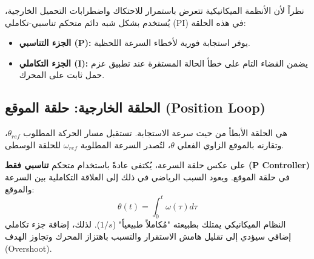 نظراً لأن الأنظمة الميكانيكية تتعرض باستمرار للاحتكاك واضطرابات التحميل الخارجية، يُستخدم بشكل شبه دائم متحكم تناسبي-تكاملي (\textenglish{PI}) في هذه الحلقة:
\begin{itemize}
    \item \textbf{الجزء التناسبي (\textenglish{P}):} يوفر استجابة فورية لأخطاء السرعة اللحظية.
    \item \textbf{الجزء التكاملي (\textenglish{I}):} يضمن القضاء التام على خطأ الحالة المستقرة عند تطبيق عزم حمل ثابت على المحرك.
\end{itemize}

\subsection{الحلقة الخارجية: حلقة الموقع (\textenglish{Position Loop})}
هي الحلقة الأبطأ من حيث سرعة الاستجابة. تستقبل مسار الحركة المطلوب $\theta_{ref}$، وتقارنه بالموقع الزاوي الفعلي $\theta$، لتُصدر السرعة المطلوبة $\omega_{ref}$ للحلقة الوسطى.

على عكس حلقة السرعة، يُكتفى عادةً باستخدام متحكم \textbf{تناسبي فقط (\textenglish{P Controller})} في حلقة الموقع. ويعود السبب الرياضي في ذلك إلى العلاقة التكاملية بين السرعة والموقع:
$$\theta(t) = \int_{0}^{t} \omega(\tau) d\tau$$
النظام الميكانيكي يمتلك بطبيعته "مُكاملاً طبيعياً" ($1/s$). لذلك، إضافة جزء تكاملي إضافي سيؤدي إلى تقليل هامش الاستقرار والتسبب باهتزاز المحرك وتجاوز الهدف (\textenglish{Overshoot}).